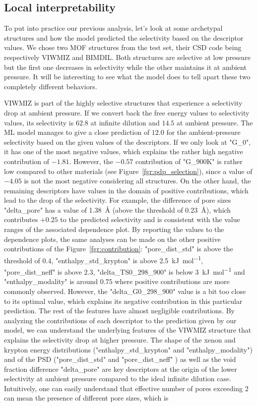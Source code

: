 \documentclass[main]{subfiles}
\begin{document}
\subsection{Local interpretability}

To put into practice our previous analysis, let's look at some archetypal structures and how the model predicted the selectivity based on the descriptor values. We chose two MOF structures from the test set, their CSD code being respectively VIWMIZ and BIMDIL. Both structures are selective at low pressure but the first one decreases in selectivity while the other maintains it at ambient pressure. It will be interesting to see what the model does to tell apart these two completely different behaviors.

VIWMIZ is part of the highly selective structures that experience a selectivity drop at ambient pressure. If we convert back the free energy values to selectivity values, its selectivity is $62.8$ at infinite dilution and $14.5$ at ambient pressure. The ML model manages to give a close prediction of $12.0$ for the ambient-pressure selectivity based on the given values of the descriptors. If we only look at "G\_0", it has one of the most negative values, which explains the rather high negative contribution of $-1.81$. However, the $-0.57$ contribution of "G\_900K" is rather low compared to other materials (see Figure~\ref{fgr:pdp_selection}), since a value of $-4.05$ is not the most negative considering all structures. On the other hand, the remaining descriptors have values in the domain of positive contributions, which lead to the drop of the selectivity. For example, the difference of pore sizes "delta\_pore" has a value of \SI{1.38}{\angstrom} (above the threshold of \SI{0.23}{\angstrom}), which contributes $+0.25$ to the predicted selectivity and is consistent with the value ranges of the associated dependence plot. By reporting the values to the dependence plots, the same analyses can be made on the other positive contributions of the Figure~\ref{fgr:contribution}: "pore\_dist\_std" is above the threshold of $0.4$, "enthalpy\_std\_krypton" is above \SI{2.5}{\kilo\joule\per\mole}, "pore\_dist\_neff" is above $2.3$, "delta\_TS0\_298\_900" is below \SI{3}{\kilo\joule\per\mole} and "enthalpy\_modality" is around $0.75$ where positive contributions are more commonly observed. However, the "delta\_G0\_298\_900" value is a bit too close to its optimal value, which explains its negative contribution in this particular prediction. The rest of the features have almost negligible contributions. By analyzing the contributions of each descriptor to the prediction given by our model, we can understand the underlying features of the VIWMIZ structure that explains the selectivity drop at higher pressure. The shape of the xenon and krypton energy distributions ("enthalpy\_std\_krypton" and "enthalpy\_modality") and of the PSD ("pore\_dist\_std" and "pore\_dist\_neff" ) as well as the void fraction difference "delta\_pore" are key descriptors at the origin of the lower selectivity at ambient pressure compared to the ideal infinite dilution case. Intuitively, one can easily understand that effective number of pores exceeding 2 can mean the presence of different pore sizes, which is 
\end{document}
